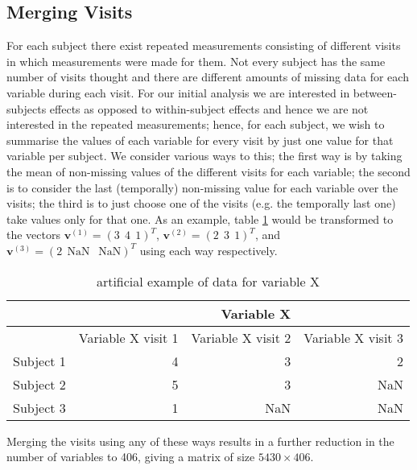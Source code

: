 \documentclass{article}
\begin{document}
\subsection*{Merging Visits}
For each subject there exist repeated measurements consisting of different visits in which measurements were made for them. Not every subject has the same number of visits thought and there are different amounts of missing data for each variable during each visit. For our initial analysis we are interested in between-subjects effects as opposed to within-subject effects and hence we are not interested in the repeated measurements; hence, for each subject, we wish to summarise the values of each variable for every visit by just one value for that variable per subject. We consider various ways to this; the first way is by taking the mean of non-missing values of the different visits for each variable; the second is to consider the last (temporally) non-missing value for each variable over the visits; the third is to just choose one of the visits (e.g. the temporally last one) take values only for that one. As an example, table \ref{table:visits} would be transformed to the vectors $\bm{v}^{(1)} =(3 \ \ 4 \ \ 1)^T$, $\bm{v}^{(2)} =(2 \ \ 3 \ \ 1)^T$, and $\bm{v}^{(3)} =(2 \ \ \text{NaN} \ \ \text{ NaN})^T$ using each way respectively. 
\begin{table}
\centering
\begin{tabular} {|r|rrr|}
\hline
& & Variable X & \\
\hline
& Variable X visit 1 & Variable X visit 2  & Variable X visit 3 \\
\hline
Subject 1 & 4 & 3  & 2 \\ 
Subject 2 & 5 & 3 & NaN \\
Subject 3 & 1 & NaN & NaN \\
\hline
\end{tabular}
\caption{artificial example of data for variable X}
\label{table:visits}
\end{table}  
Merging the visits using any of these ways results in a further reduction in the number of variables to 406, giving a matrix of size $5430\times 406$. 
\end{document}
